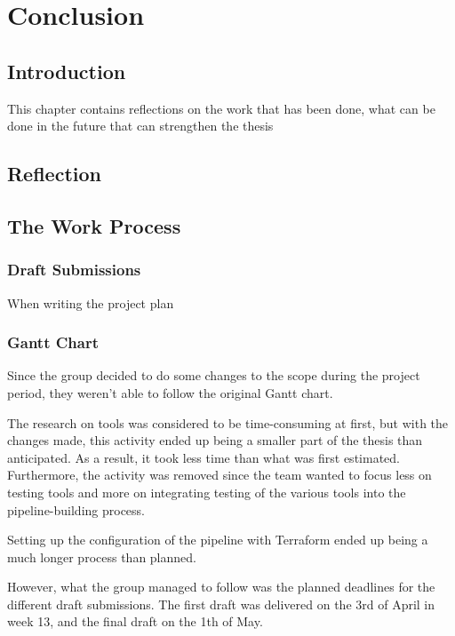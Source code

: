 \chapter{Conclusion}
\section{Introduction}
This chapter contains reflections on the work that has been done, what can be done in the future that can strengthen the thesis

\section{Reflection}


\section{The Work Process}

\subsection{Draft Submissions}
When writing the project plan 


\subsection{Gantt Chart}
Since the group decided to do some changes to the scope during the project period, they weren't able to follow the original Gantt chart. 

The research on tools was considered to be time-consuming at first, but with the changes made, this activity ended up being a smaller part of the thesis than anticipated. As a result, it took less time than what was first estimated. Furthermore, the activity was removed since the team wanted to focus less on testing tools and more on integrating testing of the various tools into the pipeline-building process. 

Setting up the configuration of the pipeline with Terraform  ended up being a much longer process than planned. 

However, what the group managed to follow was the planned deadlines for the different draft submissions. The first draft was delivered on the 3rd of April in week 13, and the final draft on the 1th of May.

